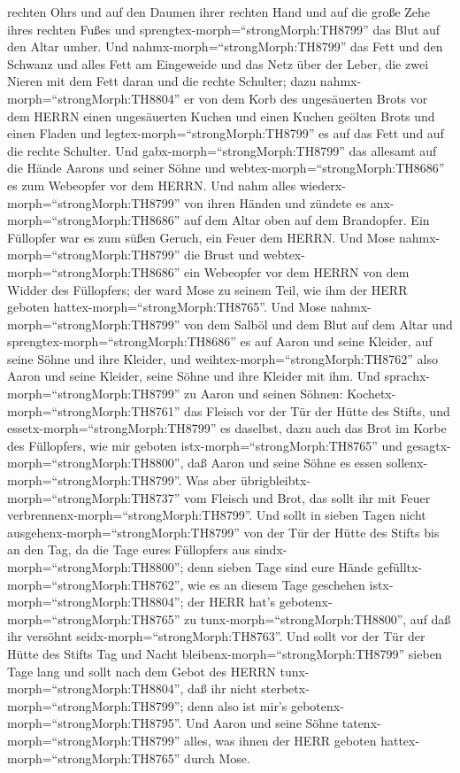 rechten Ohrs und auf den Daumen ihrer rechten Hand und auf die große
Zehe ihres rechten Fußes und sprengtex-morph=``strongMorph:TH8799'' das
Blut auf den Altar umher.  Und
nahmx-morph=``strongMorph:TH8799'' das Fett und den Schwanz und alles
Fett am Eingeweide und das Netz über der Leber, die zwei Nieren mit dem
Fett daran und die rechte Schulter;  dazu
nahmx-morph=``strongMorph:TH8804'' er von dem Korb des ungesäuerten
Brots vor dem HERRN einen ungesäuerten Kuchen und einen Kuchen geölten
Brots und einen Fladen und legtex-morph=``strongMorph:TH8799'' es auf
das Fett und auf die rechte Schulter.  Und
gabx-morph=``strongMorph:TH8799'' das allesamt auf die Hände Aarons und
seiner Söhne und webtex-morph=``strongMorph:TH8686'' es zum Webeopfer
vor dem HERRN.  Und nahm alles
wiederx-morph=``strongMorph:TH8799'' von ihren Händen und zündete es
anx-morph=``strongMorph:TH8686'' auf dem Altar oben auf dem Brandopfer.
Ein Füllopfer war es zum süßen Geruch, ein Feuer dem HERRN.
 Und Mose nahmx-morph=``strongMorph:TH8799'' die Brust und
webtex-morph=``strongMorph:TH8686'' ein Webeopfer vor dem HERRN von dem
Widder des Füllopfers; der ward Mose zu seinem Teil, wie ihm der HERR
geboten hattex-morph=``strongMorph:TH8765''.  Und Mose
nahmx-morph=``strongMorph:TH8799'' von dem Salböl und dem Blut auf dem
Altar und sprengtex-morph=``strongMorph:TH8686'' es auf Aaron und seine
Kleider, auf seine Söhne und ihre Kleider, und
weihtex-morph=``strongMorph:TH8762'' also Aaron und seine Kleider, seine
Söhne und ihre Kleider mit ihm.  Und
sprachx-morph=``strongMorph:TH8799'' zu Aaron und seinen Söhnen:
Kochetx-morph=``strongMorph:TH8761'' das Fleisch vor der Tür der Hütte
des Stifts, und essetx-morph=``strongMorph:TH8799'' es daselbst, dazu
auch das Brot im Korbe des Füllopfers, wie mir geboten
istx-morph=``strongMorph:TH8765'' und
gesagtx-morph=``strongMorph:TH8800'', daß Aaron und seine Söhne es essen
sollenx-morph=``strongMorph:TH8799''.  Was aber
übrigbleibtx-morph=``strongMorph:TH8737'' vom Fleisch und Brot, das
sollt ihr mit Feuer verbrennenx-morph=``strongMorph:TH8799''.
 Und sollt in sieben Tagen nicht
ausgehenx-morph=``strongMorph:TH8799'' von der Tür der Hütte des Stifts
bis an den Tag, da die Tage eures Füllopfers aus
sindx-morph=``strongMorph:TH8800''; denn sieben Tage sind eure Hände
gefülltx-morph=``strongMorph:TH8762'',  wie es an diesem
Tage geschehen istx-morph=``strongMorph:TH8804''; der HERR hat's
gebotenx-morph=``strongMorph:TH8765'' zu
tunx-morph=``strongMorph:TH8800'', auf daß ihr versöhnt
seidx-morph=``strongMorph:TH8763''.  Und sollt vor der Tür
der Hütte des Stifts Tag und Nacht bleibenx-morph=``strongMorph:TH8799''
sieben Tage lang und sollt nach dem Gebot des HERRN
tunx-morph=``strongMorph:TH8804'', daß ihr nicht
sterbetx-morph=``strongMorph:TH8799''; denn also ist mir's
gebotenx-morph=``strongMorph:TH8795''.  Und Aaron und seine
Söhne tatenx-morph=``strongMorph:TH8799'' alles, was ihnen der HERR
geboten hattex-morph=``strongMorph:TH8765'' durch Mose.

